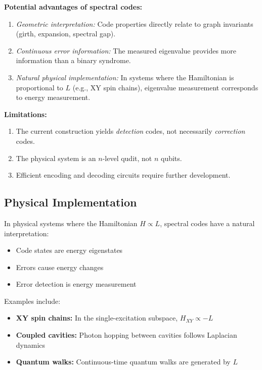 \documentclass[11pt,a4paper]{article}
\theoremstyle{definition}
\begin{document}
\textbf{Potential advantages of spectral codes:}
\begin{enumerate}[noitemsep]
    \item \emph{Geometric interpretation:} Code properties directly relate to graph invariants (girth, expansion, spectral gap).
    \item \emph{Continuous error information:} The measured eigenvalue provides more information than a binary syndrome.
    \item \emph{Natural physical implementation:} In systems where the Hamiltonian is proportional to $L$ (e.g., XY spin chains), eigenvalue measurement corresponds to energy measurement.
\end{enumerate}

\textbf{Limitations:}
\begin{enumerate}[noitemsep]
    \item The current construction yields \emph{detection} codes, not necessarily \emph{correction} codes.
    \item The physical system is an $n$-level qudit, not $n$ qubits.
    \item Efficient encoding and decoding circuits require further development.
\end{enumerate}

\subsection{Physical Implementation}

In physical systems where the Hamiltonian $H \propto L$, spectral codes have a natural interpretation:
\begin{itemize}[noitemsep]
    \item Code states are energy eigenstates
    \item Errors cause energy changes
    \item Error detection is energy measurement
\end{itemize}

Examples include:
\begin{itemize}[noitemsep]
    \item \textbf{XY spin chains:} In the single-excitation subspace, $H_{XY} \propto -L$
    \item \textbf{Coupled cavities:} Photon hopping between cavities follows Laplacian dynamics
    \item \textbf{Quantum walks:} Continuous-time quantum walks are generated by $L$
\end{itemize}
\end{document}
